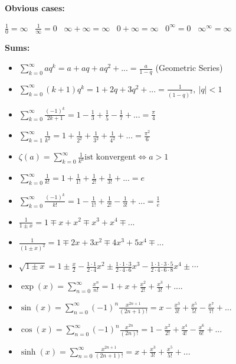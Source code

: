 \documentclass[]{article}
\begin{document}
\begin{multicols*}{3}
\textbf{Obvious cases:}

$\frac{1}{0} = \infty$ \ $\frac{1}{\infty} = 0$ \ $\infty + \infty = \infty$ \
$0 + \infty = \infty$ \ $0^{\infty} = 0$ \ $\infty^{\infty} = \infty$

\textbf{Sums:}

\begin{itemize}
  \item $\sum_{k=0}^{\infty} aq^{k} = a + aq + aq^{2} +... = \frac{a}{1-q}$ (Geometric Series)
  \item $\sum_{k=0}^{\infty} (k+1)q^{k} = 1 + 2q + 3q^{2} +... = \frac{1}{(1-q)^{2}}, \ \vert q \vert < 1$ 
  \item $\sum_{k=0}^{\infty} \frac{(-1)^{k}}{2k+1} = 1 - \frac{1}{3} + \frac{1}{5} - \frac{1}{7} + ... = \frac{\pi}{4}$
  \item $\sum_{k=1}^{\infty} \frac{1}{k^{2}} = 1 + \frac{1}{2^{2}} + \frac{1}{3^{2}} + \frac{1}{4^{2}} + ... = \frac{\pi^{2}}{6}$
  \item $\zeta(a) = \sum_{k=0}^{\infty} \frac{1}{k^{a}} \text{ist konvergent} \iff a>1$
  \item $\sum_{k=0}^{\infty} \frac{1}{k!} = 1+\frac{1}{1!} + \frac{1}{2!} + \frac{1}{3!} + ... = e$
  \item $\sum_{k=0}^{\infty} \frac{(-1)^{k}}{k!} = 1 - \frac{1}{1!} + \frac{1}{2!} - \frac{1}{3!} + ... = \frac{1}{e}$
  \item $\frac{1}{1 \pm x} = 1 \mp x + x^2 \mp x^3 + x^4 \mp ...$
  \item $\frac{1}{(1 \pm x)^2} = 1 \mp 2x + 3x^2 \mp 4x^3 + 5x^4 \mp ...$
  \item $\sqrt{1 \pm x} = 1 \pm \frac{x}{2} - \frac{\scriptstyle{1\cdot 1}}{\scriptstyle{2 \cdot 4}}x^2 \pm \frac{\scriptstyle{1\cdot 1 \cdot 3}}{\scriptstyle{2 \cdot 4 \cdot 6}}x^3 - \frac{\scriptstyle{1 \cdot 1 \cdot 3 \cdot 5}}{\scriptstyle{2 \cdot 4 \cdot 6 \cdot 8}}x^4 \pm \scriptstyle\cdots$
  \item $\exp(x) = \sum_{n=0}^{\infty} \frac{x^{n}}{n!} = 1 + x + \frac{x^{2}}{2!} + \frac{x^{3}}{3!} + ....$
  \item $\sin(x) =  \sum_{n=0}^{\infty} (-1)^{n}\frac{x^{2n+1}}{(2n +1)!} = x - \frac{x^{3}}{3!} + \frac{x^{5}}{5!} - \frac{x^{7}}{7!} + ...$ 
  \item $\cos(x) =  \sum_{n=0}^{\infty} (-1)^{n}\frac{x^{2n}}{(2n)!} = 1 - \frac{x^{2}}{2!} + \frac{x^{4}}{4!} - \frac{x^{6}}{6!} + ...$ 
  \item $\sinh(x) = \sum_{n=0}^{\infty} \frac{x^{2n+1}}{(2n+1)!} = x + \frac{x^3}{3!} + \frac{x^5}{5!} + ...$

\end{itemize}
\end{multicols*}
\end{document}
